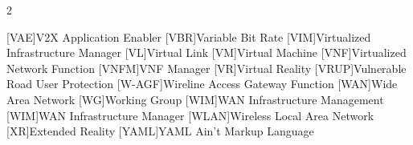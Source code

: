 \begin{multicols}{2}
\begin{acronym}[AAAAAAAAA]
	[VAE]{V2X Application Enabler}
	[VBR]{Variable Bit Rate}
	[VIM]{Virtualized Infrastructure Manager}
	[VL]{Virtual Link}
	[VM]{Virtual Machine}
	[VNF]{Virtualized Network Function}
	[VNFM]{\ac{VNF} Manager}
	[VR]{Virtual Reality}
	[VRUP]{Vulnerable Road User Protection}
	[W-AGF]{Wireline Access Gateway Function}
	[WAN]{Wide Area Network}
	[WG]{Working Group}
	[WIM]{\ac{WAN} Infrastructure Management}
	[WIM]{\ac{WAN} Infrastructure Manager}
    [WLAN]{Wireless Local Area Network}
	[XR]{Extended Reality}
	[YAML]{YAML Ain't Markup Language}
	
\end{acronym}
\end{multicols}


